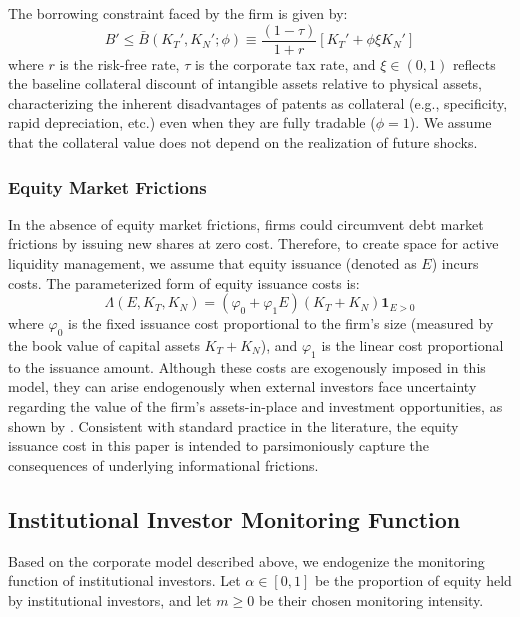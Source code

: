 \documentclass[12pt,a4paper]{article}
\begin{document}
The borrowing constraint faced by the firm is given by:
\begin{equation}
B' \le \bar{B}(K_T', K_N'; \phi) \equiv \frac{(1-\tau)}{1+r} [K_T' + \phi \xi K_N']
\end{equation}
where $r$ is the risk-free rate, $\tau$ is the corporate tax rate, and $\xi \in (0,1)$ reflects the baseline collateral discount of intangible assets relative to physical assets, characterizing the inherent disadvantages of patents as collateral (e.g., specificity, rapid depreciation, etc.) even when they are fully tradable ($\phi = 1$). We assume that the collateral value does not depend on the realization of future shocks.

\subsubsection{Equity Market Frictions}
In the absence of equity market frictions, firms could circumvent debt market frictions by issuing new shares at zero cost. Therefore, to create space for active liquidity management, we assume that equity issuance (denoted as $E$) incurs costs. The parameterized form of equity issuance costs is:
\begin{equation}
\Lambda(E, K_T, K_N) = (\varphi_0 + \varphi_1 E)(K_T + K_N) \mathbf{1}_{E>0}
\end{equation}
where $\varphi_0$ is the fixed issuance cost proportional to the firm's size (measured by the book value of capital assets $K_T + K_N$), and $\varphi_1$ is the linear cost proportional to the issuance amount. Although these costs are exogenously imposed in this model, they can arise endogenously when external investors face uncertainty regarding the value of the firm's assets-in-place and investment opportunities, as shown by \cite{myers1984corporate}. Consistent with standard practice in the literature, the equity issuance cost in this paper is intended to parsimoniously capture the consequences of underlying informational frictions.

\subsection{Institutional Investor Monitoring Function}
Based on the corporate model described above, we endogenize the monitoring function of institutional investors. Let $\alpha \in [0,1]$ be the proportion of equity held by institutional investors, and let $m \ge 0$ be their chosen monitoring intensity.
\end{document}
